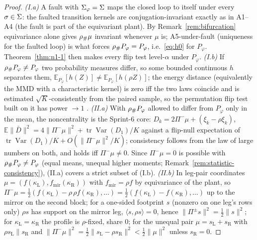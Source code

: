 \begin{proof}
\emph{(I.a)} A fault with $\Sigma_\varphi = \Sigma$ maps the closed loop to
itself under every $\sigma \in \Sigma$: the faulted transition kernels are
conjugation-invariant exactly as in A1--A4 (the fault is part of the
equivariant plant). By Remark~\ref{rem:bifurcation} equivariance alone gives
${\rho}_{\#}\mu$ invariant whenever $\mu$ is; A5-under-fault (uniqueness for
the faulted loop) is what forces ${\rho}_{\#}P_\varphi = P_\varphi$, i.e.\
\eqref{eq:h0} for $P_\varphi$. Theorem~\ref{thm:n1-1} then makes every flip
test level-$\alpha$ under $P_\varphi$. \emph{(I.b)} If ${\rho}_{\#}P_\varphi
\neq P_\varphi$ two probability measures differ, so some bounded continuous
$h$ separates them, $\mathbb{E}_{P_\varphi}[h(Z)] \neq \mathbb{E}_{P_\varphi}
[h(\rho Z)]$; the energy distance (equivalently the MMD with a characteristic
kernel) is zero iff the two laws coincide and is estimated $\sqrt K$-consistently
from the paired sample, so the permutation flip test built on it has power
$\to 1$ \cite{szekely2013energy}. \emph{(II.a)} With ${\rho}_{\#}P_\varphi$
allowed to differ from $P_\varphi$ only in the mean, the noncentrality is the
Sprint-6 core: $D_k = 2\Pi^-\mu + (\xi_k - \rho\xi_k)$, $\mathbb{E}\|\bar
D\|^2 = 4\|\Pi^-\mu\|^2 + \operatorname{tr}\operatorname{Var}(D_1)/K$ against
a flip-null expectation of $\operatorname{tr}\operatorname{Var}(D_1)/K +
O(\|\Pi^-\mu\|^2/K)$; consistency follows from the law of large numbers on
both, and holds iff $\Pi^-\mu \neq 0$. Since $\Pi^-\mu = 0$ is possible with
${\rho}_{\#}P_\varphi \neq P_\varphi$ (equal means, unequal higher moments;
Remark~\ref{rem:statistic-consistency}), (II.a) covers a strict subset of
(I.b). \emph{(II.b)} In leg-pair coordinates $\mu = (f(\kappa_{\mathrm{L}}),
f_{\mathrm{mir}}(\kappa_{\mathrm{R}}))$ with $f_{\mathrm{mir}} = \rho f$ by
equivariance of the plant, so $\Pi^-\mu = \tfrac12(f(\kappa_{\mathrm{L}}) -
\rho\,\rho f(\kappa_{\mathrm{R}}), \dots) = \tfrac12(f(\kappa_{\mathrm{L}}) -
f(\kappa_{\mathrm{R}}), \dots)$ up to the mirror on the second block; for a
one-sided footprint $s$ (nonzero on one leg's rows only) $\rho s$ has
support on the mirror leg, $\langle s, \rho s\rangle = 0$, hence
$\|\Pi^\pm s\|^2 = \tfrac12\|s\|^2$; for $\kappa_{\mathrm{L}} =
\kappa_{\mathrm{R}}$ the profile is $\rho$-fixed, share $0$; for the unequal
pair $\mu = s_{\mathrm{L}} + s_{\mathrm{R}}$ with $\rho s_{\mathrm{L}}
\parallel s_{\mathrm{R}}$ and $\|\Pi^-\mu\|^2 = \tfrac12\|s_{\mathrm{L}} -
\rho s_{\mathrm{R}}\|^2 < \tfrac12\|\mu\|^2$ unless $s_{\mathrm{R}} = 0$.
\end{proof}

